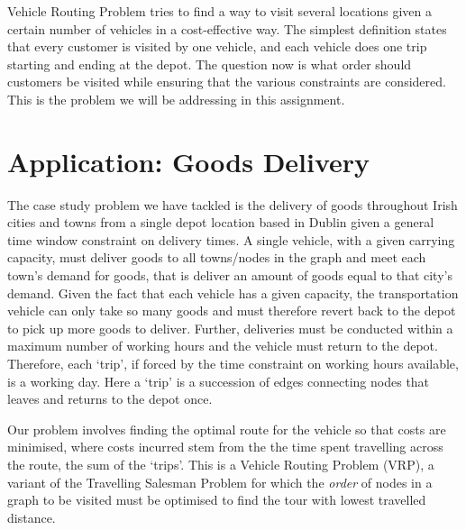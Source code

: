 \documentclass[a4paper,11pt]{article}
\begin{document}
Vehicle Routing Problem tries to find a way to visit several locations given a certain number of vehicles in a cost-effective way. The simplest definition states that every customer is visited by one vehicle, and each vehicle does one trip starting and ending at the depot. The question now is what order should customers be visited while ensuring that the various constraints are considered. This is the problem we will be addressing in this assignment.

\section{Application: Goods Delivery}
The case study problem we have tackled is the delivery of goods throughout Irish cities and towns from a single depot location based in Dublin given a general time window constraint on delivery times. A single vehicle, with a given carrying capacity, must deliver goods to all towns/nodes in the graph and meet each town's demand for goods, that is deliver an amount of goods equal to that city's demand. Given the fact that each vehicle has a given capacity, the transportation vehicle can only take so many goods and must therefore revert back to the depot to pick up more goods to deliver. Further, deliveries must be conducted within a maximum number of working hours and the vehicle must return to the depot. Therefore, each `trip', if forced by the time constraint on working hours available, is a working day. Here a `trip' is a succession of edges connecting nodes that leaves and returns to the depot once. 

Our problem involves finding the optimal route for the vehicle so that costs are minimised, where costs incurred stem from the the time spent travelling across the route, the sum of the `trips'. This is a Vehicle Routing Problem (VRP), a variant of the Travelling Salesman Problem for which the \textit{order} of nodes in a graph to be visited must be optimised to find the tour with lowest travelled distance. 
\end{document}
